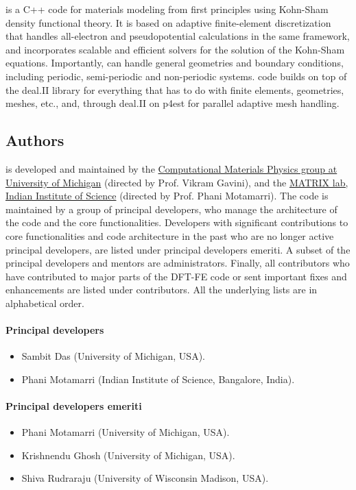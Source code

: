 \dftfe{} is a C++ code for materials modeling from first principles using Kohn-Sham density functional theory.
It is based on adaptive finite-element discretization that handles all-electron and pseudopotential calculations in the 
same framework, and incorporates scalable and efficient solvers for the solution of the Kohn-Sham equations. Importantly, \dftfe{} 
can handle general geometries and boundary conditions, including periodic, semi-periodic and non-periodic systems. \dftfe{} code 
builds on top of the deal.II library for everything that has to do with finite elements, geometries, meshes, etc., and, through 
deal.II on p4est for parallel adaptive mesh handling.

\subsection{Authors}
\label{sec:authors}
\dftfe{} is developed and maintained by the \href{http://www-personal.umich.edu/~vikramg/}{Computational Materials Physics
group at University of Michigan} (directed by Prof. Vikram Gavini), and the \href{https://sites.google.com/view/matrix-lab}{MATRIX lab, Indian Institute of Science} (directed by Prof. Phani Motamarri). The code is maintained by a group of principal developers, 
who manage the architecture of the code and the core functionalities. Developers with
significant contributions to core functionalities and code architecture in the past who are 
no longer active principal developers, are listed under principal developers emeriti. 
A subset of the principal developers and mentors are administrators. Finally, all contributors who have
contributed to major parts of the DFT-FE code or sent important fixes and enhancements are listed
under contributors. All the underlying lists are in alphabetical order. 

\paragraph{Principal developers}
\begin{itemize}
	\item Sambit Das (University of Michigan, USA).
	\item Phani Motamarri (Indian Institute of Science, Bangalore, India).
\end{itemize}

\paragraph{Principal developers emeriti}
\begin{itemize}
        \item Phani Motamarri (University of Michigan, USA).
	\item Krishnendu Ghosh (University of Michigan, USA).
	\item Shiva Rudraraju (University of Wisconsin Madison, USA).	
\end{itemize}

